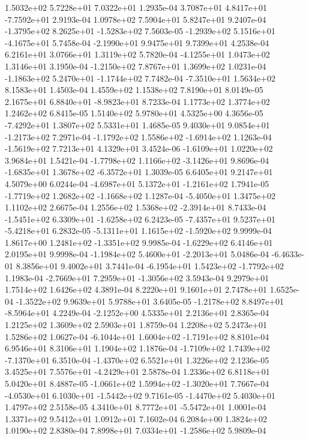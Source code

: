 1.5032e+02 5.7228e+01 7.0322e+01  1.2935e-04
 3.7087e+01  4.8417e+01 -7.7592e+01  2.9193e-04
1.0978e+02 7.5904e+01 5.8247e+01  9.2407e-04
-1.3795e+02  8.2625e+01 -1.5283e+02  7.5603e-05
-1.2939e+02  5.1516e+01 -4.1675e+01  5.7458e-04
-2.1990e+01  9.9475e+01  9.7399e+01  4.2538e-04
6.2161e+01 3.0766e+01 1.3119e+02  5.7820e-04
-4.1255e+01  1.0473e+02  1.3146e+01  3.1950e-04
-1.2150e+02  7.8767e+01  1.3699e+02  1.0231e-04
-1.1863e+02  5.2470e+01 -1.1744e+02  7.7482e-04
-7.3510e+01  1.5634e+02  8.1583e+01  1.4503e-04
1.4559e+02 1.1538e+02 7.8190e+01  8.0149e-05
 2.1675e+01  6.8840e+01 -8.9823e+01  8.7233e-04
1.1773e+02 1.3774e+02 1.2462e+02  6.8415e-05
1.5140e+02 5.9780e+01 4.5325e+00  4.3656e-05
-7.4292e+01  1.3807e+02  5.5331e+01  1.4685e-05
 9.4030e+01  9.0854e+01 -1.2173e+02  7.2971e-04
-1.1792e+02  1.5586e+02 -1.6914e+02  1.1263e-04
-1.5619e+02  7.7213e+01  4.1329e+01  3.4524e-06
-1.6109e+01  1.0220e+02  3.9684e+01  1.5421e-04
-1.7798e+02  1.1166e+02 -3.1426e+01  9.8696e-04
-1.6835e+01  1.3678e+02 -6.3572e+01  1.3039e-05
6.6405e+01 9.2147e+01 4.5079e+00  6.0244e-04
-4.6987e+01  5.1372e+01 -1.2161e+02  1.7941e-05
-1.7719e+02  1.2682e+02 -1.1668e+02  1.1287e-04
-5.4050e+01  1.3475e+02  1.1102e+02  2.6675e-04
 1.2556e+02  1.5368e+02 -2.3914e+01  8.7433e-04
-1.5451e+02  6.3309e+01 -1.6258e+02  6.2423e-05
-7.4357e+01  9.5237e+01 -5.4218e+01  6.2832e-05
-5.1311e+01  1.1615e+02 -1.5920e+02  9.9999e-04
 1.8617e+00  1.2481e+02 -1.3351e+02  9.9985e-04
-1.6229e+02  6.4146e+01  2.0195e+01  9.9998e-04
-1.1984e+02  5.4600e+01 -2.2013e+01  5.0486e-04
-6.4633e-01  8.3856e+01  9.4002e+01  3.7441e-04
-6.1954e+01  1.5423e+02 -1.7792e+02  1.1983e-04
-2.7669e+01  7.2959e+01 -1.3056e+02  3.5943e-04
9.2979e+01 1.7514e+02 1.6426e+02  4.3891e-04
8.2220e+01 9.1601e+01 2.7478e+01  1.6525e-04
-1.3522e+02  9.9639e+01  5.9788e+01  3.6405e-05
-1.2178e+02  8.8497e+01 -8.5964e+01  4.2249e-04
-2.1252e+00  4.5335e+01  2.2136e+01  2.8365e-04
1.2125e+02 1.3609e+02 2.5903e+01  1.8759e-04
1.2208e+02 5.2473e+01 1.5286e+02  1.0627e-04
-6.1044e+01  1.6004e+02 -1.7191e+02  8.8101e-04
6.9546e+01 8.3106e+01 1.1904e+02  1.1876e-04
-1.7109e+02  1.7439e+02 -7.1370e+01  6.3510e-04
-1.4370e+02  6.5521e+01  1.3226e+02  2.1236e-05
 3.4525e+01  7.5576e+01 -4.2429e+01  2.5878e-04
1.2336e+02 6.8118e+01 5.0420e+01  8.4887e-05
-1.0661e+02  1.5994e+02 -1.3020e+01  7.7667e-04
-4.0530e+01  6.1030e+01 -1.5442e+02  9.7161e-05
-1.4470e+02  5.4030e+01  1.4797e+02  2.5158e-05
 4.3410e+01  8.7772e+01 -5.5472e+01  1.0001e-04
1.3371e+02 9.5412e+01 1.0912e+01  7.1602e-04
6.2084e+00 1.3824e+02 1.0190e+02  2.8380e-04
 7.8998e+01  7.0334e+01 -1.2586e+02  5.9809e-04
